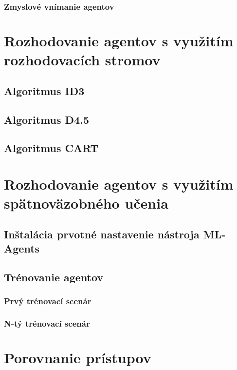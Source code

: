 \documentclass[slovak, master]{diploma}
\begin{document}
\subsection{Zmyslové vnímanie agentov}
\label{sec:Perception}

\chapter{Rozhodovanie agentov s využitím rozhodovacích stromov}
\label{sec:ImplDecisionTrees}
\section{Algoritmus ID3}
\label{sec:ID3}
\section{Algoritmus D4.5}
\label{sec:D45}
\section{Algoritmus CART}
\label{sec:CART}

\chapter{Rozhodovanie agentov s využitím spätnoväzobného učenia}
\label{sec:ImplReinforcement learning}
\section{Inštalácia prvotné nastavenie nástroja ML-Agents}
\label{sec:Agents}
\section{Trénovanie agentov}
\label{sec:Training}
\subsection{Prvý trénovací scenár}
\label{sec:FirstScenario}
\subsection{N-tý trénovací scenár}
\label{sec:LastScenario}

\chapter{Porovnanie prístupov}
\label{sec:ImplReinforcement learning}
\end{document}
